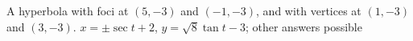 {A hyperbola with foci at $(5,-3)$ and $(-1,-3)$, and with vertices at $(1,-3)$ and $(3,-3)$.
}
{$x=\pm\sec t+2$, $y=\sqrt{8}\tan t-3$; other answers possible
}